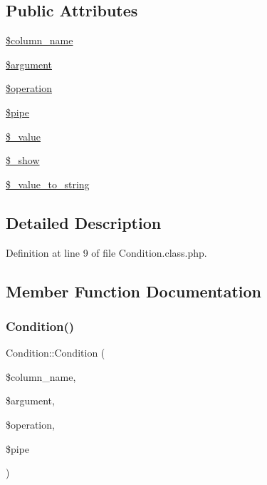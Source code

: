 \subsection*{Public Attributes}
\begin{DoxyCompactItemize}
\item 
\hyperlink{classCondition_ae34f9b605299c7142f5c9daa61b338fe}{\$column\+\_\+name}
\item 
\hyperlink{classCondition_ab2171308c722d4d35f37369762d78175}{\$argument}
\item 
\hyperlink{classCondition_aa8fbf3bdbbea0c57d3822ac585eb75a4}{\$operation}
\item 
\hyperlink{classCondition_a19b2472b462fc19e44b8fcbf1898b9cc}{\$pipe}
\item 
\hyperlink{classCondition_af8fed5d1250eb545d782e80478dac4fe}{\$\+\_\+value}
\item 
\hyperlink{classCondition_ae631b5f7e9a50ca781bd034edaf5e059}{\$\+\_\+show}
\item 
\hyperlink{classCondition_afcfd7fce951a699f3b065e227dbbacc9}{\$\+\_\+value\+\_\+to\+\_\+string}
\end{DoxyCompactItemize}


\subsection{Detailed Description}


Definition at line 9 of file Condition.\+class.\+php.



\subsection{Member Function Documentation}
\mbox{\label{classCondition_aaf108d388895d9fe832a52e5586c0ecb}} 
\subsubsection{\texorpdfstring{Condition()}{Condition()}}
{\footnotesize\ttfamily Condition\+::\+Condition (\begin{DoxyParamCaption}\item[{}]{\$column\+\_\+name,  }\item[{}]{\$argument,  }\item[{}]{\$operation,  }\item[{}]{\$pipe }\end{DoxyParamCaption})}

